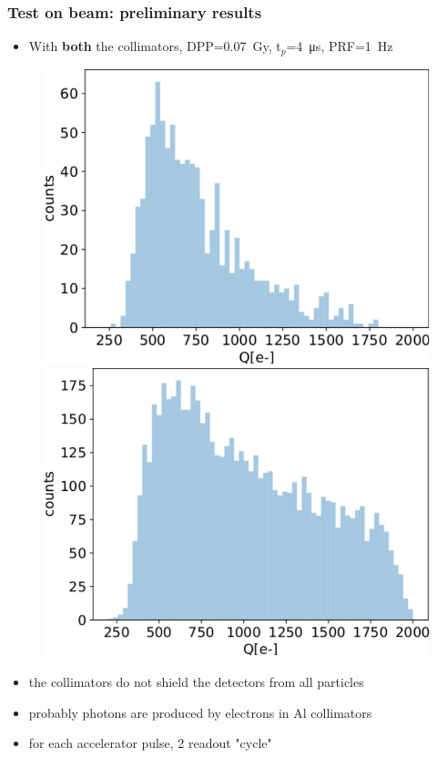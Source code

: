     \begin{frame}[noframenumbering]
        \frametitle{Test on beam: preliminary results}
        \begin{itemize}
            \item With \textbf{both} the collimators, DPP=\SI{0.07}{Gy}, t$_p$=\SI{4}{\us}, PRF=\SI{1}{Hz}
        \end{itemize}
        \medskip
        \begin{figure}
            \includegraphics[width=0.49\linewidth]{figures/test_beam/Q1_17_11.pdf}
            \includegraphics[width=.49\linewidth]{figures/test_beam/Q2_17_11.pdf}
        \end{figure}
        \begin{itemize}
            \item the collimators do not shield the detectors from all particles
            \item probably photons are produced by electrons in Al collimators
            \item for each accelerator pulse, 2 readout "cycle"  
        \end{itemize}
    \end{frame} 
    
